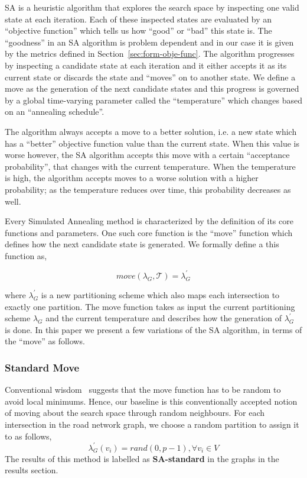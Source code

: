 SA is a heuristic algorithm that explores the search space by inspecting one valid state at each iteration. Each of these inspected states are evaluated by an ``objective function'' which tells us how ``good'' or ``bad'' this state is. The ``goodness'' in an SA algorithm is problem dependent and in our case it is given by the metrics defined in Section~\ref{sec:form-obje-func}. The algorithm progresses by inspecting a candidate state at each iteration and it either accepts it as its current state or discards the state and ``moves'' on to another state. We define a move as the generation of the next candidate states and this progress is governed by a global time-varying parameter called the ``temperature'' which changes based on an ``annealing schedule''.

The algorithm always accepts a move to a better solution, i.e. a new state which has a ``better'' objective function value than the current state. When this value is worse however, the SA algorithm accepts this move with a certain ``acceptance probability'', that changes with the current temperature. When the temperature is high, the algorithm accepts moves to a worse solution with a higher probability; as the temperature reduces over time, this probability decreases as well.

 Every Simulated Annealing method is characterized by the definition of its core functions and parameters. One such core function is the ``move'' function which defines how the next candidate state is generated. We formally define a this function as,

\begin{equation}
\label{eq:move-func}
move(\lambda_G, \mathcal{T}) =  \lambda_G^{'}
\end{equation}

\noindent where $\lambda_G^{'}$ is a new partitioning scheme which also maps each intersection to exactly one partition. The move function takes as input the current partitioning scheme $\lambda_G$ and the current temperature and describes how the generation of $\lambda_G^{'}$ is done. In this paper we present a few variations of the SA algorithm, in terms of the ``move'' as follows.

\subsubsection{Standard Move}
\label{sec:opti-std}
Conventional wisdom~\cite{orsila2006parameterizing} suggests that the move function has to be random to avoid local minimums. Hence, our baseline is this conventionally accepted notion of moving about the search space through random neighbours. For each intersection in the road network graph, we choose a random partition to assign it to as follows,
\begin{equation}
\label{eq:std-move}
\lambda_G^{'}(v_i) = rand(0, p-1), \forall v_i \in V
\end{equation}
\noindent The results of this method is labelled as \textbf{SA-standard} in the graphs in the results section.


